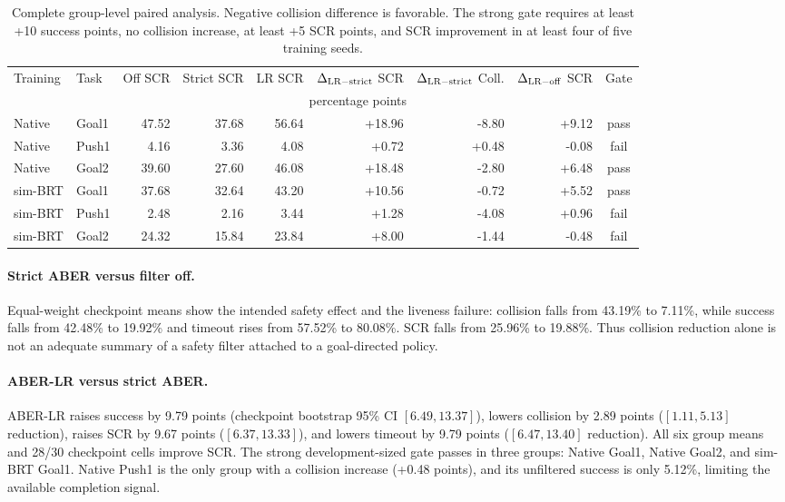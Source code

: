 \documentclass[letterpaper]{article}
\begin{document}
\begin{table}[t]
\centering
\small
\setlength{\tabcolsep}{3.1pt}
\begin{tabular}{llrrrrrrc}
\toprule
Training & Task & Off SCR & Strict SCR & LR SCR &
$\Delta_{\rm LR-strict}$ SCR & $\Delta_{\rm LR-strict}$ Coll. &
$\Delta_{\rm LR-off}$ SCR & Gate\\
 & & \multicolumn{6}{c}{percentage points} & \\
\midrule
Native & Goal1 & 47.52 & 37.68 & 56.64 & +18.96 & -8.80 & +9.12 & pass\\
Native & Push1 & 4.16 & 3.36 & 4.08 & +0.72 & +0.48 & -0.08 & fail\\
Native & Goal2 & 39.60 & 27.60 & 46.08 & +18.48 & -2.80 & +6.48 & pass\\
sim-BRT & Goal1 & 37.68 & 32.64 & 43.20 & +10.56 & -0.72 & +5.52 & pass\\
sim-BRT & Push1 & 2.48 & 2.16 & 3.44 & +1.28 & -4.08 & +0.96 & fail\\
sim-BRT & Goal2 & 24.32 & 15.84 & 23.84 & +8.00 & -1.44 & -0.48 & fail\\
\bottomrule
\end{tabular}
\caption{Complete group-level paired analysis.  Negative collision difference
is favorable.  The strong gate requires at least +10 success points, no
collision increase, at least +5 SCR points, and SCR improvement in at least
four of five training seeds.}
\label{tab:aber-lr-groups}
\end{table}

\paragraph{Strict ABER versus filter off.}
Equal-weight checkpoint means show the intended safety effect and the
liveness failure: collision falls from 43.19\% to 7.11\%, while success falls
from 42.48\% to 19.92\% and timeout rises from 57.52\% to 80.08\%.  SCR falls
from 25.96\% to 19.88\%.  Thus collision reduction alone is not an adequate
summary of a safety filter attached to a goal-directed policy.

\paragraph{ABER-LR versus strict ABER.}
ABER-LR raises success by 9.79 points (checkpoint bootstrap 95\% CI
$[6.49,13.37]$), lowers collision by 2.89 points
($[1.11,5.13]$ reduction), raises SCR by 9.67 points
($[6.37,13.33]$), and lowers timeout by 9.79 points
($[6.47,13.40]$ reduction).  All six group means and 28/30 checkpoint cells
improve SCR.  The strong development-sized gate passes in three groups:
Native Goal1, Native Goal2, and sim-BRT Goal1.  Native Push1 is the only group
with a collision increase (+0.48 points), and its unfiltered success is only
5.12\%, limiting the available completion signal.
\end{document}

